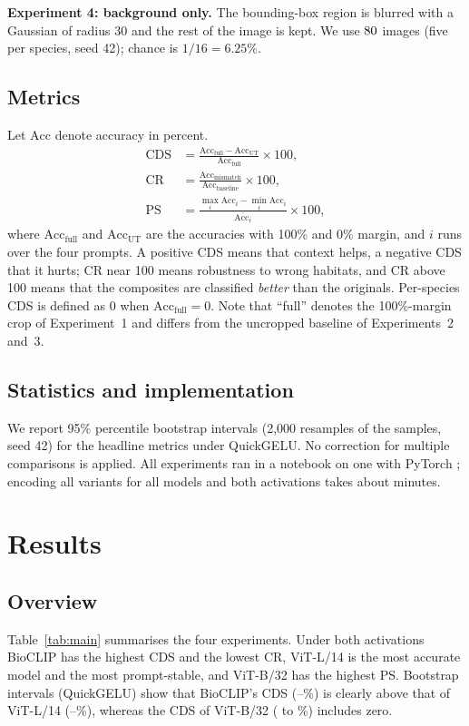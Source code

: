 \documentclass[conference]{IEEEtran}
\begin{document}
\textbf{Experiment 4: background only.} The bounding-box region is blurred with a Gaussian of radius 30 and the rest of the image is kept. We use $80{}$ images (five per species, seed 42); chance is $1/16=6.25\%$.

\subsection{Metrics}
Let $\mathrm{Acc}$ denote accuracy in percent.
\begin{align}
\mathrm{CDS} &= \frac{\mathrm{Acc}_\text{full}-\mathrm{Acc}_\text{UT}}{\mathrm{Acc}_\text{full}}\times 100, \\
\mathrm{CR} &= \frac{\mathrm{Acc}_\text{mismatch}}{\mathrm{Acc}_\text{baseline}}\times 100, \\
\mathrm{PS} &= \frac{\max_i \mathrm{Acc}_i-\min_i \mathrm{Acc}_i}{\overline{\mathrm{Acc}_i}}\times 100,
\end{align}
where $\mathrm{Acc}_\text{full}$ and $\mathrm{Acc}_\text{UT}$ are the accuracies with 100\% and 0\% margin, and $i$ runs over the four prompts. A positive CDS means that context helps, a negative CDS that it hurts; CR near 100 means robustness to wrong habitats, and CR above 100 means that the composites are classified \emph{better} than the originals. Per-species CDS is defined as 0 when $\mathrm{Acc}_\text{full}=0$. Note that ``full'' denotes the 100\%-margin crop of Experiment~1 and differs from the uncropped baseline of Experiments~2 and~3.

\subsection{Statistics and implementation}
We report 95\% percentile bootstrap intervals (2{,}000 resamples of the samples, seed 42) for the headline metrics under QuickGELU. No correction for multiple comparisons is applied. All experiments ran in a notebook on one \GPUName{} with PyTorch \TorchVer{}; encoding all variants for all models and both activations takes about \RuntimeMin{} minutes.

\section{Results}
\subsection{Overview}
Table~\ref{tab:main} summarises the four experiments. Under both activations BioCLIP has the highest CDS and the lowest CR, ViT-L/14 is the most accurate model and the most prompt-stable, and ViT-B/32 has the highest PS. Bootstrap intervals (QuickGELU) show that BioCLIP's CDS (\QBioCDSLo--\QBioCDSHi\%) is clearly above that of ViT-L/14 (\QVLCDSLo--\QVLCDSHi\%), whereas the CDS of ViT-B/32 (\QVBCDSLo{} to \QVBCDSHi\%) includes zero.
\end{document}
